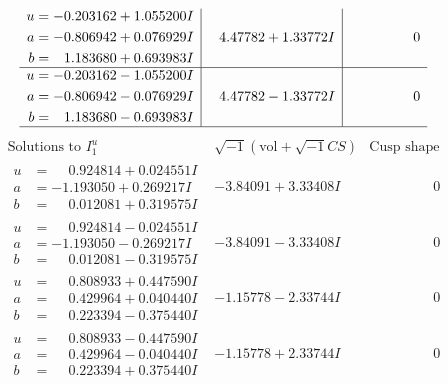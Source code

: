 \documentclass[1p]{elsarticle_modified}
\theoremstyle{definition}
\newcommand{\I}{\sqrt{-1}}
\begin{document}
$$\begin{array}{c|c|c}
\begin{aligned}
u &= -0.203162 + 1.055200 I \\
a &= -0.806942 + 0.076929 I \\
b &= \phantom{-}1.183680 + 0.693983 I\end{aligned}
 & \phantom{-}4.47782 + 1.33772 I & \phantom{-0.000000 } 0 \\ \hline\begin{aligned}
u &= -0.203162 - 1.055200 I \\
a &= -0.806942 - 0.076929 I \\
b &= \phantom{-}1.183680 - 0.693983 I\end{aligned}
 & \phantom{-}4.47782 - 1.33772 I & \phantom{-0.000000 } 0\\
 \hline 
 \end{array}$$\newpage$$\begin{array}{c|c|c}  
\text{Solutions to }I^u_{1}& \I (\text{vol} + \sqrt{-1}CS) & \text{Cusp shape}\\
 \hline 
\begin{aligned}
u &= \phantom{-}0.924814 + 0.024551 I \\
a &= -1.193050 + 0.269217 I \\
b &= \phantom{-}0.012081 + 0.319575 I\end{aligned}
 & -3.84091 + 3.33408 I & \phantom{-0.000000 } 0 \\ \hline\begin{aligned}
u &= \phantom{-}0.924814 - 0.024551 I \\
a &= -1.193050 - 0.269217 I \\
b &= \phantom{-}0.012081 - 0.319575 I\end{aligned}
 & -3.84091 - 3.33408 I & \phantom{-0.000000 } 0 \\ \hline\begin{aligned}
u &= \phantom{-}0.808933 + 0.447590 I \\
a &= \phantom{-}0.429964 + 0.040440 I \\
b &= \phantom{-}0.223394 - 0.375440 I\end{aligned}
 & -1.15778 - 2.33744 I & \phantom{-0.000000 } 0 \\ \hline\begin{aligned}
u &= \phantom{-}0.808933 - 0.447590 I \\
a &= \phantom{-}0.429964 - 0.040440 I \\
b &= \phantom{-}0.223394 + 0.375440 I\end{aligned}
 & -1.15778 + 2.33744 I & \phantom{-0.000000 } 0 \\ \hline\begin{aligned}

\end{aligned}
\end{array}$$
\end{document}
